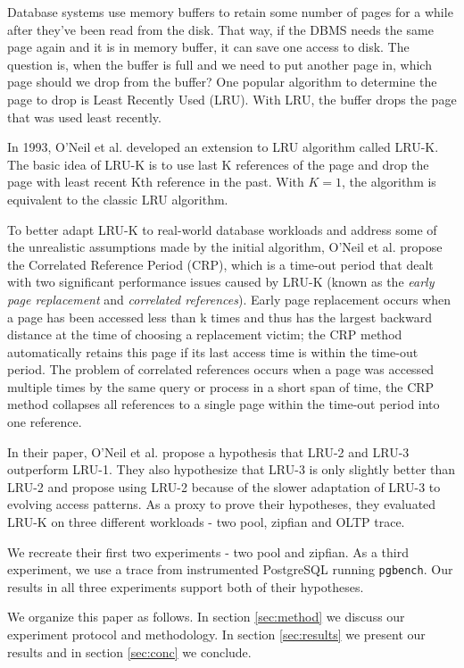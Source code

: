 Database systems use memory buffers to retain some number of pages for a while after they've been read from the disk. That way, if the DBMS needs the same page again and it is in memory buffer, it can save one access to disk. The question is, when the buffer is full and we need to put another page in, which page should we drop from the buffer? One popular algorithm to determine the page to drop is Least Recently Used (LRU). With LRU, the buffer drops the page that was used least recently.

In 1993, O'Neil et al. \cite{lruk} developed an extension to LRU algorithm called LRU-K. The basic idea of LRU-K is to use last K references of the page and drop the page with least recent Kth reference in the past. With $K = 1$, the algorithm is equivalent to the classic LRU algorithm.

To better adapt LRU-K to real-world database workloads and address some of the unrealistic assumptions made by the initial algorithm, O'Neil et al. propose the Correlated Reference Period (CRP), which is a time-out period that dealt with two significant performance issues caused by LRU-K (known as the \emph{early page replacement} and \emph{correlated references}). Early page replacement occurs when a page has been accessed less than k times and thus has the largest backward distance at the time of choosing a replacement victim; the CRP method automatically retains this page if its last access time is within the time-out period. The problem of correlated references occurs when a page was accessed multiple times by the same query or process in a short span of time, the CRP method collapses all references to a single page within the time-out period into one reference.

In their paper, O'Neil et al. propose a hypothesis that LRU-2 and LRU-3 outperform LRU-1. They also hypothesize that LRU-3 is only slightly better than LRU-2 and propose using LRU-2 because of the slower adaptation of LRU-3 to evolving access patterns. As a proxy to prove their hypotheses, they evaluated LRU-K on three different workloads - two pool, zipfian and OLTP trace.

We recreate their first two experiments - two pool and zipfian. As a third experiment, we use a trace from instrumented PostgreSQL running \texttt{pgbench}. Our results in all three experiments support both of their hypotheses.

We organize this paper as follows. In section \ref{sec:method} we discuss our experiment protocol and methodology. In section \ref{sec:results} we present our results and in section \ref{sec:conc} we conclude.
